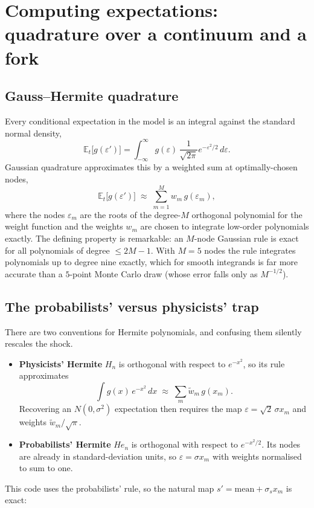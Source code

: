 \documentclass[11pt]{article}
\numberwithin{equation}{section}
\newcommand{\E}{\mathbb{E}}
\theoremstyle{definition}
\theoremstyle{plain}
\theoremstyle{remark}
\begin{document}
\section{Computing expectations: quadrature over a continuum and a fork}
\label{sec:quadrature}

\subsection{Gauss--Hermite quadrature}

Every conditional expectation in the model is an integral against the standard normal
density,
\begin{equation}
\E_t\bigl[g(\varepsilon')\bigr]
=\int_{-\infty}^{\infty}g(\varepsilon)\,\frac{1}{\sqrt{2\pi}}e^{-\varepsilon^{2}/2}\,d\varepsilon .
\label{eq:expectation-integral}
\end{equation}
Gaussian quadrature approximates this by a weighted sum at optimally-chosen nodes,
\begin{equation}
\E_t\bigl[g(\varepsilon')\bigr]\;\approx\;\sum_{m=1}^{M}w_m\,g(\varepsilon_m),
\label{eq:gh-rule}
\end{equation}
where the nodes $\varepsilon_m$ are the roots of the degree-$M$ orthogonal polynomial
for the weight function and the weights $w_m$ are chosen to integrate low-order
polynomials exactly. The defining property is remarkable: an $M$-node Gaussian rule
is exact for all polynomials of degree $\le 2M-1$. With $M=5$ nodes the rule
integrates polynomials up to degree nine exactly, which for smooth integrands is
far more accurate than a $5$-point Monte Carlo draw (whose error falls only as
$M^{-1/2}$).

\subsection{The probabilists' versus physicists' trap}

There are two conventions for Hermite polynomials, and confusing them silently
rescales the shock.

\begin{itemize}
\item \textbf{Physicists' Hermite} $H_n$ is orthogonal with respect to
      $e^{-x^{2}}$, so its rule approximates
      \[\textstyle\int g(x)\,e^{-x^{2}}\,dx\;\approx\;\sum_m \tilde w_m\,g(x_m).\]
      Recovering an $N(0,\sigma^{2})$ expectation then requires the map
      $\varepsilon=\sqrt{2}\,\sigma x_m$ and weights $\tilde w_m/\sqrt{\pi}$.
\item \textbf{Probabilists' Hermite} $He_n$ is orthogonal with respect to
      $e^{-x^{2}/2}$. Its nodes are already in standard-deviation units, so
      $\varepsilon=\sigma x_m$ with weights normalised to sum to one.
\end{itemize}
This code uses the probabilists' rule, so the natural map $s'=\text{mean}+\sigma_s x_m$
is exact:
\end{document}
